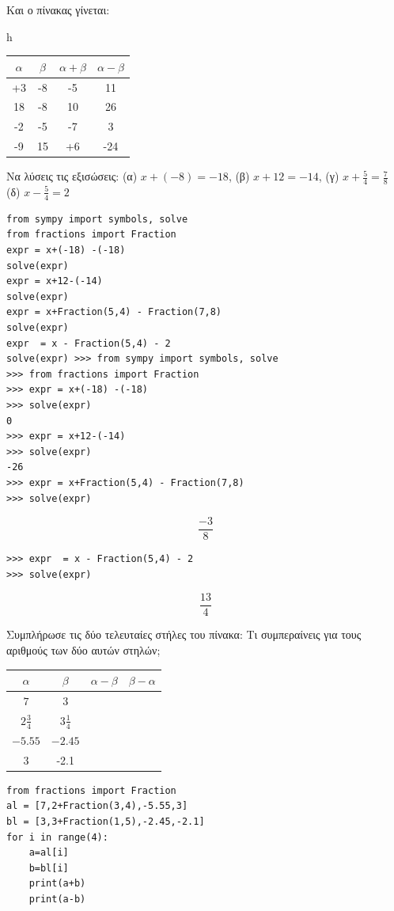 Και ο πίνακας γίνεται:
\begin{table}{h}
\begin{tabular}{|c|c|c|c|}
\hline
$\alpha$&$\beta$&$\alpha+\beta$&$\alpha-\beta$\\\hline
+3&-8&-5&11\\\hline
18&-8&10&26\\\hline
-2&-5&-7&3\\\hline
-9&15&+6&-24\\\hline
\end{tabular}
\end{table}
\begin{exercise}
Να  λύσεις  τις εξισώσεις:  (α) $x+(-8) = -18$, 
(β) $x + 12 = -14$,
(γ) $x+ \frac{5}{4} = \frac{7}{8}$
(δ) $x- \frac{5}{4} = 2$
\end{exercise}
\begin{lstlisting}
from sympy import symbols, solve
from fractions import Fraction
expr = x+(-18) -(-18)
solve(expr)
expr = x+12-(-14)
solve(expr)
expr = x+Fraction(5,4) - Fraction(7,8)
solve(expr)
expr  = x - Fraction(5,4) - 2
solve(expr) >>> from sympy import symbols, solve
>>> from fractions import Fraction
>>> expr = x+(-18) -(-18)
>>> solve(expr)
0
>>> expr = x+12-(-14)
>>> solve(expr)
-26
>>> expr = x+Fraction(5,4) - Fraction(7,8)
>>> solve(expr)
\end{lstlisting}
$$\frac{-3}{8}$$
\begin{lstlisting}
>>> expr  = x - Fraction(5,4) - 2
>>> solve(expr)
\end{lstlisting}
$$\frac{13}{4}$$
\begin{exercise}
Συμπλήρωσε  τις δύο τελευταίες  στήλες  του πίνακα:
Τι   συμπεραίνεις    για     τους    αριθμούς    των     δύο     αυτών  
στηλών;
\begin{table}[h]
\begin{tabular}{|c|c|c|c|}
$\alpha$&$\beta$&$\alpha-\beta$&$\beta-\alpha$\\\hline
$7$&$3$&&\\\hline
$2\frac{3}{4}$&$3\frac{1}{4}$&&\\\hline
$-5.55$&$-2.45$&&\\\hline
$3$&-2.1&&\\\hline
\end{tabular}
\end{table}
\end{exercise}
\begin{lstlisting}
from fractions import Fraction
al = [7,2+Fraction(3,4),-5.55,3]
bl = [3,3+Fraction(1,5),-2.45,-2.1]
for i in range(4):
    a=al[i]
    b=bl[i]
    print(a+b)
    print(a-b)
\end{lstlisting}
